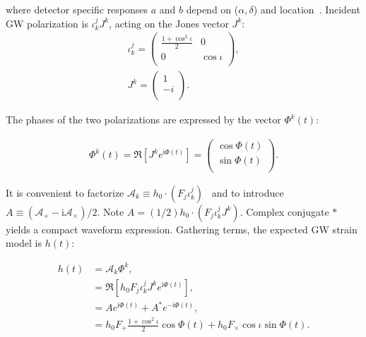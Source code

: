 \noindent where detector specific responses $a$ and $b$ depend on ($\alpha,\delta$) and location~\cite{Jaranowski1998}. Incident GW polarization is $\iota^j_k J^k$, acting on the Jones vector $J^k$:
%
%
%
\begin{eqnarray}
\iota^j_k =
\left(
\begin{array}{cc}
\frac{1+\cos^2 \iota}{2} & 0 \\
0 & \cos \iota \\
\end{array}
\right),\\
J^k = \left(
\begin{array}{c}
1\\
-i\\
\end{array}
\right).
\end{eqnarray}

\noindent The phases of the two polarizations are expressed by the vector $\Phi^k(t)$:

\begin{eqnarray}
\Phi^k(t) =
\Re\left[J^k e^{\mathrm{i} \Phi(t)} \right]
=
\left(
\begin{array}{c}
\cos \Phi(t)\\
\sin \Phi(t)\\
\end{array}
\right).
\end{eqnarray}

\noindent It is convenient to factorize $\mathcal{A}_k \equiv h_0 \cdot (F_j \iota^j_k)$~\cite{TwoSpectCoherentGoetz2015} and to introduce $A \equiv (\mathcal{A}_+ - \mathrm{i} \mathcal{A}_\times )/2$. 
Note $A = (1/2)h_0 \cdot (F_j \iota^j_k J^k)$. 
Complex conjugate $*$ yields a compact waveform expression.
Gathering terms, the expected GW strain model is $h(t)$:

\begin{eqnarray}
h(t)
 &= \mathcal{A}_k \Phi^k, \\
 &= \Re\left[h_0 F_j \iota^j_k J^k e^{\mathrm{i}\Phi(t)}\right], \\
  &= A e^{\mathrm{i}\Phi(t)} + A^* e^{-\mathrm{i}\Phi(t)}, \label{Evan_expression_ht}\\
&= h_0 F_+ \frac{1+\cos^2 \iota}{2}\cos \Phi(t) +
  h_0 F_\times \cos \iota \sin \Phi(t).
\label{amplitude_model}
\end{eqnarray}

